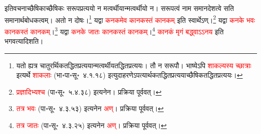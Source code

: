 \begin{sloppypar}\justifying\noindent इतिवचनाच्छैषिकाच्छैषिकः सरूप\-प्रत्ययो न मत्वर्थीयान्मत्वर्थीयो न। सरूपत्वं नाम समान\-देशत्वे सति समानार्थ\-बोधकत्वम्। अतो न दोषः।\footnote{यतो ह्यत्र चातुरर्थिक\-तद्धित\-प्रत्ययान्मत्वर्थीय\-तद्धित\-प्रत्ययः। तौ न सरूपौ। भाष्येऽपि \textcolor{red}{शाकल्यस्य च्छात्राः} इत्यर्थे \textcolor{red}{शाकलाः} (भा॰पा॰सू॰~४.१.१८) इत्युदाहरणेऽपत्यार्थक\-तद्धित\-प्रत्ययाच्छैषिक\-तद्धित\-प्रत्ययः।} यद्वा \textcolor{red}{कनकमेव कानकस्तं कानकम्} इति स्वार्थेऽण्।\footnote{\textcolor{red}{प्रज्ञादिभ्यश्च} (पा॰सू॰~५.४.३८) इत्यनेन। प्रक्रिया पूर्ववत्।}  यद्वा \textcolor{red}{कनके भवः कानकस्तं कानकम्}।\footnote{\textcolor{red}{तत्र भवः} (पा॰सू॰~४.३.५३) इत्यनेन \textcolor{red}{अण्‌}। प्रक्रिया पूर्ववत्।} यद्वा \textcolor{red}{कनके जातः कानकस्तं कानकम्}।\footnote{\textcolor{red}{तत्र जातः} (पा॰सू॰~४.३.२५) इत्यनेन \textcolor{red}{अण्‌}। प्रक्रिया पूर्ववत्।} \textcolor{red}{कानकं मृगं बद्ध्वाऽऽनय} इति भगवत्यादिशति।\end{sloppypar}
